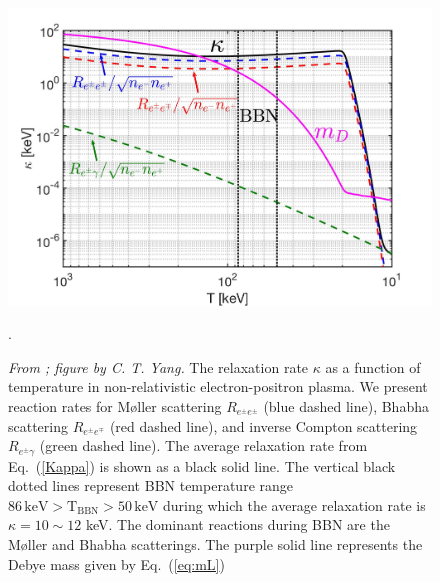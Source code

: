 \begin{figure}[h!]
\begin{center}
\includegraphics[width=0.95\linewidth]{plots/chap03BBN/May152023Kappa_EPPlasma002}
\caption{\textit{From \cite{Grayson:2023flr}; figure by C. T. Yang.} The relaxation rate $\kappa$ as a function of temperature in non-relativistic electron-positron plasma. We present reaction rates for M{\o}ller scattering $R_{e^\pm e^\pm}$ (blue dashed line), Bhabha scattering $R_{e^\pm e^\mp}$ (red dashed line), and inverse Compton scattering $R_{e^\pm \gamma}$ (green dashed line). The average relaxation rate from Eq.~(\ref{Kappa}) is shown as a black solid line. The vertical black dotted lines represent BBN temperature range $86\,\mathrm{keV}>\mathrm{T_{BBN}}>50\,\mathrm{keV}$ during which the average relaxation rate is $\kappa=10\sim12$ keV. The dominant reactions during BBN are the M{\o}ller and Bhabha scatterings. The purple solid line represents the Debye mass given by Eq.~(\ref{eq:mL})}.
\label{RelaxationRate_fig}
\end{center}
\end{figure}
